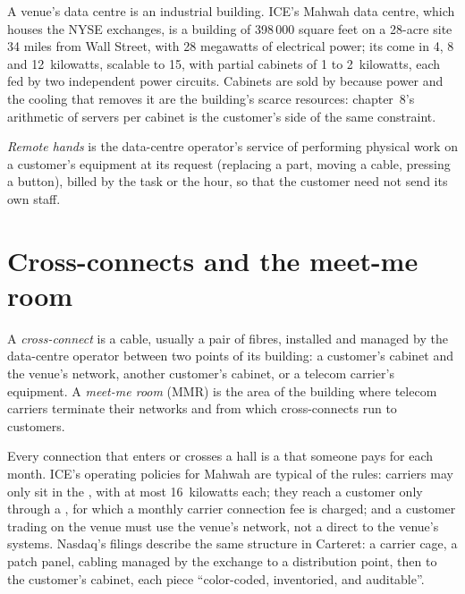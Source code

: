 A venue's data centre is an industrial building. ICE's Mahwah data centre, which houses the NYSE exchanges, is a building of 398\,000
square feet on a 28-acre site 34 miles from Wall Street, with 28 megawatts of electrical power; its  come in 4, 8 and
12~kilowatts, scalable to 15, with partial cabinets of 1 to 2~kilowatts, each fed by two independent power circuits. Cabinets are sold by
 because power and the cooling that removes it are the building's scarce resources: chapter~8's arithmetic of servers per
cabinet is the customer's side of the same constraint.

\begin{definition}\label{def:nw:colocation-products-and-how-they-are-sold:hands}
\emph{Remote hands} is the data-centre operator's service of performing physical work on a customer's equipment at its
request (replacing a part, moving a cable, pressing a button), billed by the task or the hour, so that the customer need not send its own
staff.
\end{definition}

\section{Cross-connects and the meet-me room}

\begin{definition}\label{def:nw:colocation-products-and-how-they-are-sold:mmr}
A \emph{cross-connect} is a cable, usually a pair of fibres, installed and managed by the data-centre operator between
two points of its building: a customer's cabinet and the venue's network, another customer's cabinet, or a telecom carrier's equipment. A
\emph{meet-me room} (MMR) is the area of the building where telecom carriers terminate their networks and from which
cross-connects run to customers.
\end{definition}

Every connection that enters or crosses a  hall is a  that someone pays for each month. ICE's operating policies for
Mahwah are typical of the rules: carriers may only sit in the , with at most 16~kilowatts each; they reach a customer only
through a , for which a monthly carrier connection fee is charged; and a customer trading on the venue must use the venue's
network, not a direct  to the venue's systems. Nasdaq's filings describe the same structure in Carteret: a carrier cage, a
patch panel, cabling managed by the exchange to a distribution point, then to the customer's cabinet, each piece ``color-coded, inventoried,
and auditable''.

